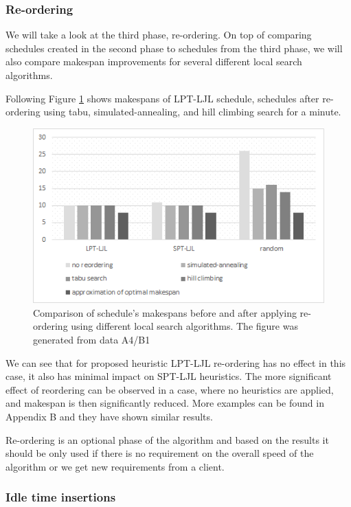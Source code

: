 \documentclass{ctuthesis}
\begin{document}
\subsubsection{Re-ordering}
\label{subsubsec:reordering}
We will take a look at the third phase, re-ordering. On top of comparing schedules created in the second phase to schedules from the third phase, we will also compare makespan improvements for several different local search algorithms.

Following Figure \ref{fig:reor1} shows makespans of LPT-LJL schedule, schedules after re-ordering using tabu, simulated-annealing, and hill climbing search for a minute.

\begin{figure}[H]
\includegraphics[width=1\linewidth]{reor1.png}
\caption{Comparison of schedule's makespans before and after applying re-ordering using different local search algorithms. The figure was generated from data A4/B1}
\label{fig:reor1}
\end{figure}

We can see that for proposed heuristic LPT-LJL re-ordering has no effect in this case, it also has minimal impact on SPT-LJL heuristics. The more significant effect of reordering can be observed in a case, where no heuristics are applied, and makespan is then significantly reduced. More examples can be found in Appendix B and they have shown similar results.

Re-ordering is an optional phase of the algorithm and based on the results it should be only used if there is no requirement on the overall speed of the algorithm or we get new requirements from a client. 

\subsubsection{Idle time insertions}
\label{subsubsec:idletimeinsertions}
\end{document}
